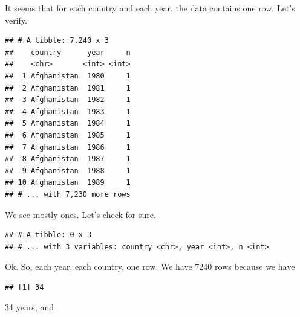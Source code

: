 \documentclass[]{tufte-book}
\newenvironment{Shaded}{}{}
\newcommand{\DecValTok}[1]{\textcolor[rgb]{0.25,0.63,0.44}{#1}}
\newcommand{\KeywordTok}[1]{\textcolor[rgb]{0.00,0.44,0.13}{\textbf{#1}}}
\newcommand{\NormalTok}[1]{#1}
\newcommand{\OperatorTok}[1]{\textcolor[rgb]{0.40,0.40,0.40}{#1}}
\newcommand{\StringTok}[1]{\textcolor[rgb]{0.25,0.44,0.63}{#1}}
\begin{document}
It seems that for each country and each year, the data contains one row. Let's verify.

\begin{Shaded}
\end{Shaded}

\begin{verbatim}
## # A tibble: 7,240 x 3
##    country      year     n
##    <chr>       <int> <int>
##  1 Afghanistan  1980     1
##  2 Afghanistan  1981     1
##  3 Afghanistan  1982     1
##  4 Afghanistan  1983     1
##  5 Afghanistan  1984     1
##  6 Afghanistan  1985     1
##  7 Afghanistan  1986     1
##  8 Afghanistan  1987     1
##  9 Afghanistan  1988     1
## 10 Afghanistan  1989     1
## # ... with 7,230 more rows
\end{verbatim}

We see mostly ones. Let's check for sure.

\begin{Shaded}
\end{Shaded}

\begin{verbatim}
## # A tibble: 0 x 3
## # ... with 3 variables: country <chr>, year <int>, n <int>
\end{verbatim}

Ok. So, each year, each country, one row. We have 7240 rows because we have

\begin{Shaded}
\end{Shaded}

\begin{verbatim}
## [1] 34
\end{verbatim}

34 years, and
\end{document}
